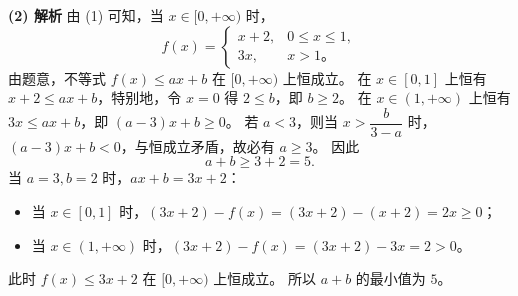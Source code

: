 \begin{answer}
\textbf{(2) 解析} 由 (1) 可知，当 $x \in [0, +\infty)$ 时，
\nopagebreak[4]
\[f(x) = \begin{cases} x + 2, & 0 \leqslant x \leqslant 1, \\ 3x, & x > 1\mbox{。} \end{cases}\]
由题意，不等式 $f(x) \leqslant ax + b$ 在 $[0, +\infty)$ 上恒成立。
在 $x \in [0, 1]$ 上恒有 $x + 2 \leqslant ax + b$，特别地，令 $x = 0$ 得 $2 \leqslant b$，即 $b \geqslant 2$。
在 $x \in (1, +\infty)$ 上恒有 $3x \leqslant ax + b$，即 $(a - 3)x + b \geqslant 0$。
若 $a < 3$，则当 $x > \dfrac{b}{3 - a}$ 时，$(a - 3)x + b < 0$，与恒成立矛盾，故必有 $a \geqslant 3$。
因此
\nopagebreak[4]
\[a + b \geqslant 3 + 2 = 5.\]
当 $a = 3, b = 2$ 时，$ax + b = 3x + 2$：
\begin{itemize}
\item 当 $x \in [0, 1]$ 时，$(3x + 2) - f(x) = (3x + 2) - (x + 2) = 2x \geqslant 0$；
\item 当 $x \in (1, +\infty)$ 时，$(3x + 2) - f(x) = (3x + 2) - 3x = 2 > 0$。
\end{itemize}
此时 $f(x) \leqslant 3x + 2$ 在 $[0, +\infty)$ 上恒成立。
所以 $a + b$ 的最小值为 $5$。



\end{answer}